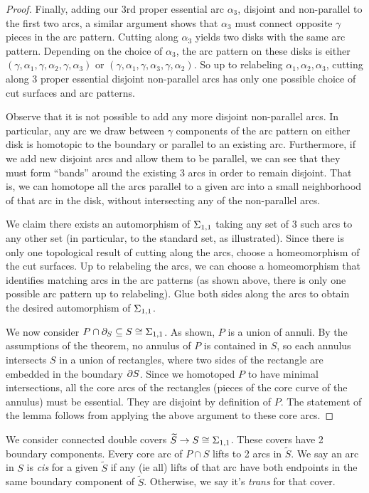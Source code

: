\begin{proof}
Finally, adding our 3rd proper essential arc $\alpha_3$, disjoint and
non-parallel to the first two arcs, a similar argument shows that $\alpha_3$
must connect opposite $\gamma$ pieces in the arc pattern. Cutting along
$\alpha_3$ yields two disks with the same arc pattern. Depending on the choice
of $\alpha_3$, the arc pattern on these disks is either
$(\gamma,\alpha_1,\gamma,\alpha_2,\gamma,\alpha_3)$ or
$(\gamma,\alpha_1,\gamma,\alpha_3,\gamma,\alpha_2)$. So up to relabeling
$\alpha_1,\alpha_2,\alpha_3$, cutting along 3 proper essential disjoint
non-parallel arcs has only one possible choice of cut surfaces and arc
patterns.

Observe that it is not possible to add any more disjoint non-parallel arcs. In
particular, any arc we draw between $\gamma$ components of the arc pattern on
either disk is homotopic to the boundary or parallel to an existing arc.
Furthermore, if we add new disjoint arcs and allow them to be parallel, we can
see that they must form ``bands'' around the existing 3 arcs in order to remain
disjoint. That is, we can homotope all the arcs parallel to a given arc into
a small neighborhood of that arc in the disk, without intersecting any of the
non-parallel arcs.

We claim there exists an automorphism of $\Sigma_{1,1}$ taking any set of 3 such
arcs to any other set (in particular, to the standard set, as illustrated).
Since there is only one topological result of cutting along the arcs, choose
a homeomorphism of the cut surfaces. Up to relabeling the arcs, we can choose
a homeomorphism that identifies matching arcs in the arc patterns (as shown
above, there is only one possible arc pattern up to relabeling). Glue both
sides along the arcs to obtain the desired automorphism of $\Sigma_{1,1}$.

We now consider $P \cap \partial_S \subseteq S \cong \Sigma_{1,1}$. As shown, $P$ is a union
of annuli. By the assumptions of the theorem, no annulus of $P$ is contained in
$S$, so each annulus intersects $S$ in a union of rectangles, where two sides
of the rectangle are embedded in the boundary $\partial S$.  Since we homotoped $P$
to have minimal intersections, all the core arcs of the rectangles (pieces of
the core curve of the annulus) must be essential. They are disjoint by
definition of $P$. The statement of the lemma follows from applying the above
argument to these core arcs.

\end{proof}

We consider connected double covers $\widetilde{S} \to S \cong \Sigma_{1,1}$.
These covers have 2 boundary components. Every core arc of $P \cap S$ lifts to
2 arcs in $\widetilde{S}$.  We say an arc in $S$ is \emph{cis} for a given
$\widetilde{S}$ if any (ie all) lifts of that arc have both endpoints in the
same boundary component of $\widetilde{S}$.  Otherwise, we say it's
\emph{trans} for that cover.

